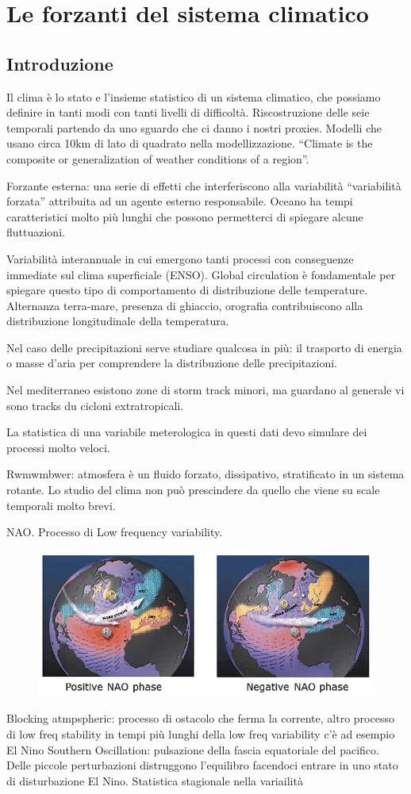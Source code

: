\chapter{Le forzanti del sistema climatico}
\section{Introduzione}
Il clima è lo stato e l’insieme statistico di un sistema climatico, che possiamo definire in tanti modi con tanti livelli di difficoltà. Riscostruzione delle seie temporali partendo da uno sguardo che ci danno i nostri proxies. Modelli che usano circa 10km di lato di quadrato nella modellizzazione. “Climate is the composite or generalization of weather conditions of a region”. 

Forzante esterna: una serie di effetti che interferiscono alla variabilità “variabilità forzata” attribuita ad un agente esterno responsabile. Oceano ha tempi caratteristici molto più lunghi che possono permetterci di spiegare alcune fluttuazioni. 

Variabilità interannuale in cui emergono tanti processi con conseguenze immediate sul clima superficiale (ENSO). Global circulation è fondamentale per spiegare questo tipo di comportamento di distribuzione delle temperature. Alternanza terra-mare, presenza di ghiaccio, orografia contribuiscono alla distribuzione longitudinale della temperatura. 

Nel caso delle precipitazioni serve studiare qualcosa in più: il trasporto di energia o masse d’aria per comprendere la distribuzione delle precipitazioni.

Nel mediterraneo esistono zone di storm track minori, ma guardano al generale vi sono tracks du cicloni extratropicali. 

La statistica di una variabile meterologica in questi dati devo simulare dei processi molto veloci. 

Rwmwmbwer: atmosfera è un fluido forzato, dissipativo, stratificato in un sistema rotante. Lo studio del clima non può prescindere da quello che viene su scale temporali molto brevi.

NAO. Processo di Low frequency variability.

\begin{figure}[htpb]
    \centering
    \includegraphics[width=0.5\linewidth]{uploads/NAO phases.png}
\end{figure}
Blocking atmpspheric: processo di ostacolo che ferma la corrente, altro processo di low freq stability in tempi più lunghi della low freq variability c’è ad esempio El Nino Southern Oscillation: pulsazione della fascia equatoriale del pacifico. Delle piccole perturbazioni distruggono l’equilibro facendoci entrare in uno stato di disturbazione El Nino. Statistica stagionale nella variailità 

